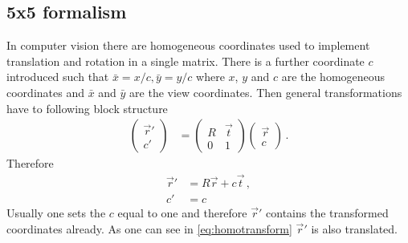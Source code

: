 \documentclass[12pt,a4paper,twoside,openright,BCOR10mm,headsepline,titlepage,abstracton,chapterprefix,final]{scrreprt}
\begin{document}
\subsection{5x5 formalism}
In computer vision there are homogeneous coordinates used to implement translation and rotation in a single matrix.
There is a further coordinate $c$ introduced such that $\bar{x} = x/c, \bar{y} = y/c$ where $x$, $y$ and $c$
are the homogeneous coordinates and $\bar{x}$ and $\bar{y}$ are the view coordinates. Then general transformations have to following block
structure
\begin{align}
 \begin{pmatrix} \vec{r}' \\ c' \end{pmatrix} &= 
 \begin{pmatrix}
  R & \vec{t} \\
  0 & 1
 \end{pmatrix}
 \begin{pmatrix}
  \vec{r} \\ 
  c
 \end{pmatrix}\,.
\end{align}
Therefore
\begin{align}
 \vec{r}' &= R \vec{r} + c \vec{t}\,,\label{eq:homotransform}\\
 c' &= c
\end{align}
Usually one sets the $c$ equal to one and therefore $\vec{r}'$ contains
the transformed coordinates already. As one can see in \eqref{eq:homotransform}
$\vec{r}'$ is also translated.
\end{document}

